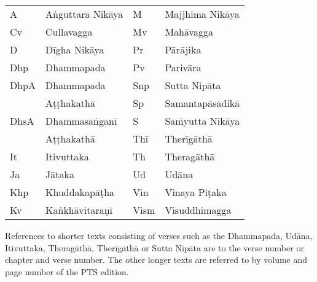 \clearpage
\thispagestyle{empty}

{}
\bigskip

{\raggedright
\ifhandbookedition
\fontsize{9}{13}\selectfont
\else
\fontsize{10}{14}\selectfont
\fi

\begin{tabular}{@{}llll@{}}
  A    & Aṅguttara Nikāya &  M    & Majjhima Nikāya \\
  Cv   & Cullavagga       &  Mv   & Mahāvagga       \\
  D    & Dīgha Nikāya     &  Pr   & Pārājika        \\
  Dhp  & Dhammapada       &  Pv   & Parivāra        \\
  DhpA & Dhammapada       &  Snp  & Sutta Nipāta    \\
       & Aṭṭhakathā       &  Sp   & Samantapāsādikā \\
  DhsA & Dhammasaṅganī    &  S    & Saṁyutta Nikāya \\
       & Aṭṭhakathā       &  Thī  & Therīgāthā      \\
  It   & Itivuttaka       &  Th   & Theragāthā      \\
  Ja   & Jātaka           &  Ud   & Udāna           \\
  Khp  & Khuddakapāṭha    &  Vin  & Vinaya Piṭaka   \\
  Kv   & Kaṅkhāvitaraṇī   &  Vism & Visuddhimagga   \\
\end{tabular}

\bigskip

References to shorter texts consisting of verses such as the Dhammapada, Udāna,
Itivuttaka, Theragāthā, Therīgāthā or Sutta Nipāta are to the verse number or
chapter and verse number. The other longer texts are referred to by volume and
page number of the PTS edition.

}

